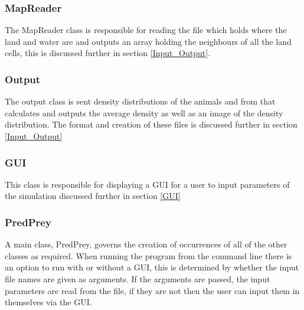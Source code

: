 \documentclass[11pt]{report}
\begin{document}
\subsubsection{MapReader}
\label{sec:MapReader}
The MapReader class is responsible for reading the file which holds where the land and water are and outputs an array holding the neighbours of all the land cells, this is discussed further in section \ref{Input_Output}.

\subsubsection{Output}
\label{sec:Output}
The output class is sent density distributions of the animals and from that calculates and outputs the average density as well as an image of the density distribution. The format and creation of these files is discussed further in section \ref{Input_Output}

\subsubsection{GUI}
\label{sec:GUI}
This class is responsible for displaying a GUI for a user to input parameters of the simulation discussed further in section \ref{GUI}


\subsubsection{PredPrey}
\label{sec:PredPrey}
 A main class, PredPrey, governs the creation of occurrences of all of the other classes as required. When running the program from the command line there is an option to run with or without a GUI, this is determined by whether the input file names are given as arguments. If the arguments are passed, the input parameters are read from the file, if they are not then the user can input them in themselves via the GUI.
\end{document}
